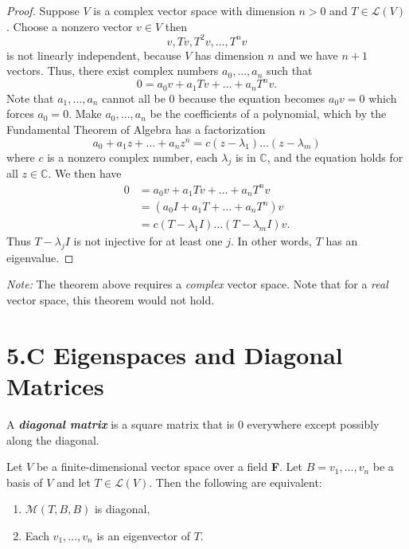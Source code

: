 \documentclass[11pt]{article}
\begin{document}
    \begin{proof}
        Suppose $V$ is a complex vector space with dimension \(n>0\) and \(T \in \mathcal{L}(V)\). Choose a nonzero vector \(v \in V\) then \[v, Tv, T^2 v, \dots, T^n v\] is not linearly independent, because $V$ has dimension $n$ and we have \(n+1\) vectors. Thus, there exist complex numbers \(a_0, \dots, a_n\) such that \[0 = a_0 v + a_1 Tv + \dots + a_n T^{n}v.\] Note that \(a_1, \dots, a_n\) cannot all be 0 because the equation becomes \(a_0 v = 0\) which forces \(a_0 = 0.\) Make \(a_0, \dots, a_n\) be the coefficients of a polynomial, which by the Fundamental Theorem of Algebra has a factorization \[a_0 + a_1 z + \dots + a_n z^n = c(z - \lambda_1) \dots (z - \lambda_m)\] where $c$ is a nonzero complex number, each \(\lambda_j\) is in \(\mathbb{C}\), and the equation holds for all \(z \in \mathbb{C}\). We then have 
        \begin{align*}
            0 &= a_0 v + a_1 Tv + \dots + a_n T^n v \\
              &= (a_0 I + a_1 T + \dots + a_n T^n)v \\
              &= c(T - \lambda_1 I) \dots (T - \lambda_m I)v.
        \end{align*}
        Thus \(T - \lambda_j I\) is not injective for at least one $j$. In other words, $T$ has an eigenvalue. 
    \end{proof}

    \emph{Note:} The theorem above requires a \emph{complex} vector space. Note that for a \emph{real} vector space, this theorem would not hold. 

    \section{5.C Eigenspaces and Diagonal Matrices}

    A \textbf{\emph{diagonal matrix}} is a square matrix that is 0 everywhere except possibly along the diagonal.

    \vspace{1em}

    Let $V$ be a finite-dimensional vector space over a field \textbf{F}. Let \(B = v_1, \dots, v_n\) be a basis of $V$ and let \(T \in \mathcal{L}(V)\). Then the following are equivalent:
    \begin{enumerate}
        \item \(\mathcal{M}(T,B,B)\) is diagonal,
        \item Each \(v_1, \dots, v_n\) is an eigenvector of $T$. 
    \end{enumerate}
\end{document}

